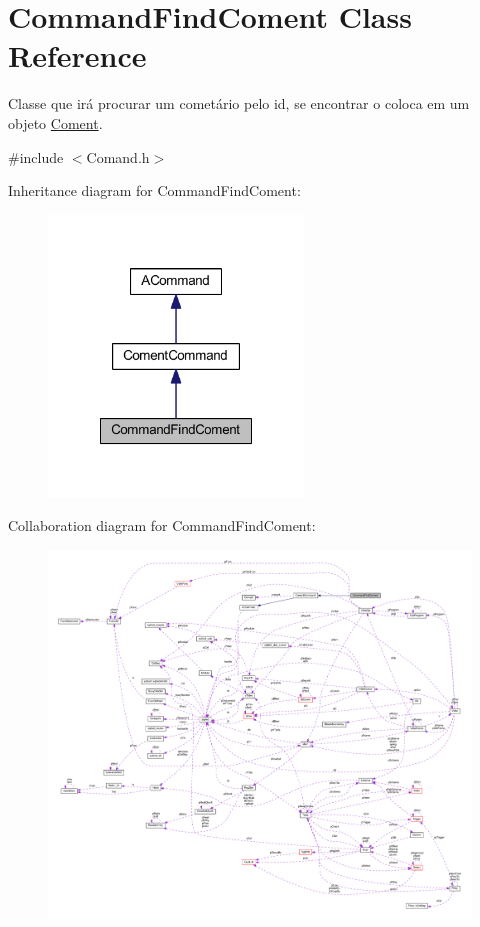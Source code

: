 \hypertarget{class_command_find_coment}{\section{Command\-Find\-Coment Class Reference}
\label{class_command_find_coment}
}


Classe que irá procurar um cometário pelo id, se encontrar o coloca em um objeto \hyperlink{class_coment}{Coment}.  




{\ttfamily \#include $<$Comand.\-h$>$}



Inheritance diagram for Command\-Find\-Coment\-:\nopagebreak
\begin{figure}[H]
\begin{center}
\leavevmode
\includegraphics[width=192pt]{class_command_find_coment__inherit__graph}
\end{center}
\end{figure}


Collaboration diagram for Command\-Find\-Coment\-:\nopagebreak
\begin{figure}[H]
\begin{center}
\leavevmode
\includegraphics[width=350pt]{class_command_find_coment__coll__graph}
\end{center}
\end{figure}
